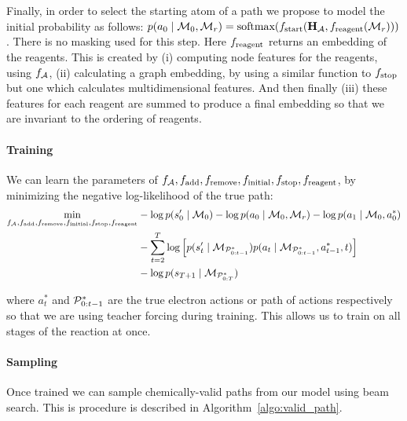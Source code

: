 Finally, in order to select the starting atom of a path we propose to model the initial probability as follows: $p(a_0 \mid \moleculeSet_0, \moleculeSet_r) = \mbox{softmax}(f_{\textrm{start}}(\Hb_{\Ac}, \fReagEmbed(\moleculeSet_r)))$. There is no masking used for this step. Here $\fReagEmbed$ returns an embedding of the reagents. This is created by (i) computing node features for the reagents, using $f_{\Ac}$, (ii) calculating a graph embedding, by using a similar function to $\fStop$ but one which calculates multidimensional features. And then finally (iii) these features for each reagent are summed  to produce a final embedding so that we are invariant to the ordering of reagents.

\paragraph{Training}
We can learn the parameters of $\fModules$, by minimizing the negative log-likelihood of the true path:
\begin{align*}
  \min_{\fModules}
    & - \log \continueProb{0}{0} - \log p(a_0 \mid \moleculeSet_0, \moleculeSet_r)  - \log p(a_1 \mid \moleculeSet_0, a^*_0) \\
	& - \sum_{t=2}^{T} \log \Big[ \continueProb{t}{\electronPath_{0:t-1}^*} \actionProb[*]{t} \Big] \\
    & - \log p(s_{T+1} \mid \moleculeSet_{\electronPath_{0:T}^*})
\end{align*}


where $a_t^*$ and $\electronPath_{0:t-1}^*$ are the true electron actions or path of actions respectively so that we are using teacher forcing \citep{williams1989learning} during training. This allows us to train on all stages of the reaction at once.

\paragraph{Sampling}
Once trained we can sample chemically-valid paths from our model using beam search.  This is procedure is described in Algorithm~\ref{algo:valid_path}. 



